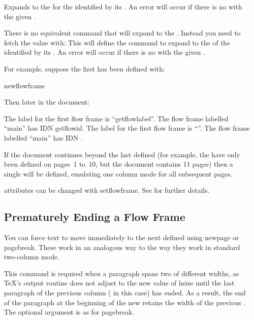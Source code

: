 \documentclass[fontsize=12pt]{scrbook}
\begin{document}
Expands to the  for the  identified by its
. An error will occur if there is no  with
the given .

There is no equivalent command that will expand to the .
Instead you need to fetch the value with:
This will define the command  to expand to the  of the
 identified by its . An error will occur if
there is no  with the given .

For example, suppose the first  has been defined
with:
\begin{codebox}
\gls{newflowframe}\marg{0pt}\marg{0pt}
\end{codebox}
Then later in the document:
\begin{coderesult}
The label for the first 
flow frame is 
``\gls{getflowlabel}''.
The flow frame labelled 
``main'' has IDN 
\gls{getflowid}.
\tcblower
The label for the first flow frame is ``''.
The flow frame labelled ``main'' has IDN 
\myid.
\end{coderesult}

If the document continues beyond the last
defined  (for example, the  have only
been defined on pages~1 to~10, but the document contains 11 
pages) then a single  will be defined, 
emulating one column mode for all subsequent pages.

\begin{information}
 attributes can be changed with \gls{setflowframe}.
See  for further details.
\end{information}

\subsection{Prematurely Ending a Flow Frame}
\label{sec:framebreak}

You can force text to move immediately to the next defined
 using \gls{newpage} or \gls{pagebreak}. These work
in an analogous way to the way they work in standard two-column
mode.

This command is required when a paragraph spans two
 of different widths, as \TeX's output routine
does not adjust to the new value of \gls{hsize} until the last
paragraph of the previous column ( in this case) has
ended. As a result, the end of the paragraph at the beginning of the
new  retains the width of the previous
. The optional argument is as for \gls{pagebreak}.
\end{document}
